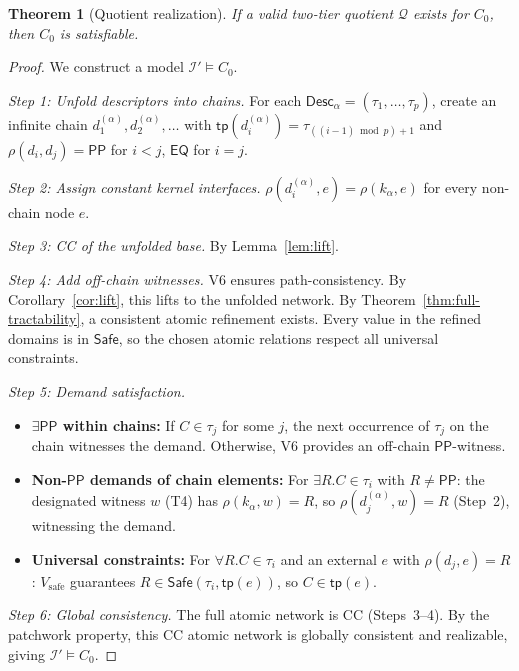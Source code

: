 \documentclass[a4paper,11pt]{article}
\newtheorem{theorem}{Theorem}[section]
\theoremstyle{definition}
\newcommand{\EQ}{\ensuremath{\mathsf{EQ}}}
\newcommand{\PP}{\ensuremath{\mathsf{PP}}}
\newcommand{\tp}{\ensuremath{\mathsf{tp}}}
\newcommand{\Desc}{\ensuremath{\mathsf{Desc}}}
\newcommand{\Safe}{\ensuremath{\mathsf{Safe}}}
\newcommand{\interp}{\ensuremath{\mathcal{I}}}
\begin{document}
\begin{theorem}[Quotient realization]\label{thm:soundness}
If a valid two-tier quotient $\mathcal{Q}$ exists for $C_0$, then
$C_0$ is satisfiable.
\end{theorem}

\begin{proof}
We construct a model $\interp' \models C_0$.

\medskip\noindent\textit{Step 1: Unfold descriptors into chains.}\;
For each $\Desc_\alpha = (\tau_1, \ldots, \tau_p)$, create an
infinite chain $d_1^{(\alpha)}, d_2^{(\alpha)}, \ldots$ with
$\tp(d_i^{(\alpha)}) = \tau_{((i-1) \bmod p) + 1}$ and
$\rho(d_i, d_j) = \PP$ for $i < j$, $\EQ$ for $i = j$.

\medskip\noindent\textit{Step 2: Assign constant kernel
interfaces.}\;
$\rho(d_i^{(\alpha)}, e) = \rho(k_\alpha, e)$ for every non-chain
node $e$.

\medskip\noindent\textit{Step 3: CC of the unfolded base.}\;
By Lemma~\ref{lem:lift}.

\medskip\noindent\textit{Step 4: Add off-chain witnesses.}\;
V6 ensures path-consistency.  By Corollary~\ref{cor:lift}, this
lifts to the unfolded network.  By
Theorem~\ref{thm:full-tractability}, a consistent atomic refinement
exists.  Every value in the refined domains is in $\Safe$, so the
chosen atomic relations respect all universal constraints.

\medskip\noindent\textit{Step 5: Demand satisfaction.}\;
\begin{itemize}
\item \textbf{$\exists\PP$ within chains:} If $C \in \tau_j$ for
  some $j$, the next occurrence of $\tau_j$ on the chain witnesses
  the demand.  Otherwise, V6 provides an off-chain $\PP$-witness.
\item \textbf{Non-$\PP$ demands of chain elements:} For
  $\exists R.C \in \tau_i$ with $R \ne \PP$: the designated witness
  $w$ (T4) has $\rho(k_\alpha, w) = R$, so
  $\rho(d_j^{(\alpha)}, w) = R$ (Step~2), witnessing the demand.
\item \textbf{Universal constraints:} For $\forall R.C \in \tau_i$
  and an external $e$ with $\rho(d_j, e) = R$:
  $V_{\mathrm{safe}}$ guarantees
  $R \in \Safe(\tau_i, \tp(e))$, so $C \in \tp(e)$.
\end{itemize}

\medskip\noindent\textit{Step 6: Global consistency.}\;
The full atomic network is CC (Steps~3--4).  By the patchwork
property, this CC atomic network is globally consistent and
realizable, giving $\interp' \models C_0$.
\end{proof}
\end{document}
